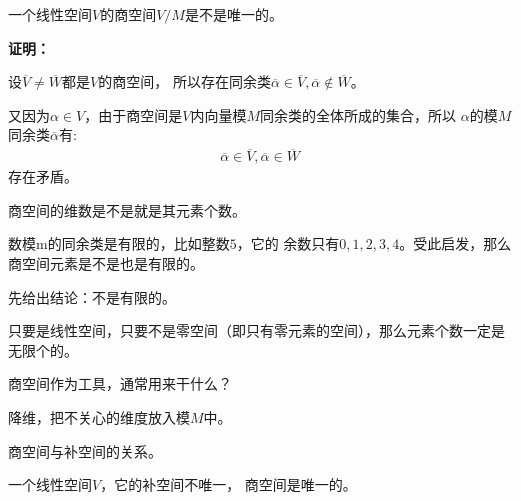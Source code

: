 \documentclass{article}
\begin{document}
\begin{zremark}
  一个线性空间$V$的商空间$V/M$是不是唯一的。
\end{zremark}

\textbf{证明：}

设$\overline{V} \neq \overline{W}$都是$V$的商空间，
所以存在同余类$\overline{\alpha} \in \overline{V}, \overline{\alpha} \notin \overline{W}$。

又因为$\alpha \in V$，由于商空间是$V$内向量模$M$同余类的全体所成的集合，所以
$\alpha$的模$M$同余类$\overline{\alpha}$有:
\begin{align*}
  \overline{\alpha} \in \overline{V}, \overline{\alpha} \in \overline{W}
\end{align*}
存在矛盾。

\begin{zremark}
  商空间的维数是不是就是其元素个数。
\end{zremark}

数模m的同余类是有限的，比如整数$5$，它的
余数只有$0, 1, 2, 3, 4$。受此启发，那么商空间元素是不是也是有限的。

先给出结论：不是有限的。

只要是线性空间，只要不是零空间（即只有零元素的空间），那么元素个数一定是无限个的。

\begin{zremark}
  商空间作为工具，通常用来干什么？
\end{zremark}

降维，把不关心的维度放入模$M$中。

\begin{zremark}
  商空间与补空间的关系。
\end{zremark}

一个线性空间$V$，它的补空间不唯一，
商空间是唯一的。
\end{document}
